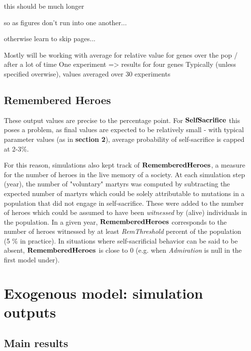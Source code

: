 \documentclass[a4paper,12pt]{report}
\begin{document}
this should be much longer


so as figures don't run into one another... 

otherwise learn to skip pages...

Mostly will be working with average for relative value for genes over the pop / after a lot of time
One experiment => results for four genes
Typically (unless specified overwise), values averaged over 30 experiments

\subsection{Remembered Heroes}
\label{ss:RH}
These output values are precise to the percentage point. 
For $\bf{SelfSacrifice}$ this poses a problem, as final values are expected to be relatively
small - with typical parameter values (as in \textbf{section 2}), average probability of self-sacrifice
 is capped at 2-3\%.

For this reason, simulations also kept track of $\bf{RememberedHeroes}$, a measure for the number of heroes 
in the live memory of a society. At each simulation step (year), the number of "voluntary" martyrs was computed
 by subtracting the expected number of martyrs which could be solely attributable to mutations in a population
 that did not engage in self-sacrifice. These were added to the number of heroes which could be assumed to have
 been \emph{witnessed} by (alive) individuals in the population. In a given year, $\bf{RememberedHeroes}$ corresponds
 to the number of heroes witnessed by at least \emph{RemThreshold} percent of the population (5 \% in practice).
 In situations where self-sacrificial behavior can be said to be absent, $\bf{RememberedHeroes}$ is close to 0
 (e.g. when \emph{Admiration} is null in the first model under).

\section{Exogenous model: simulation outputs}

\subsection{Main results}
\end{document}
